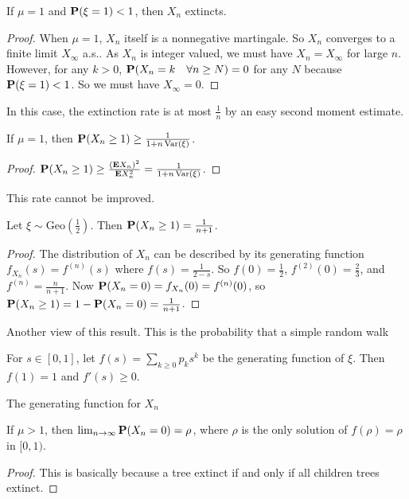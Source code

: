 \begin{theorem}[critical]
    If $\mu=1$ and $\mathbf{P}(\xi=1)<1$, then $X_n$ extincts.
\end{theorem}
\begin{proof}
    When $\mu=1$, $X_n$ itself is a nonnegative martingale. So $X_n$ converges to a finite limit $X_\infty$ a.s..
    As $X_n$ is integer valued, we must have $X_n= X_\infty$ for large $n$. 
    However, for any $k>0$, $\mathbf{P}(X_n=k\quad \forall n\geq N)=0$ for any $N$ because $\mathbf{P}(\xi=1)<1$. So we must have $X_\infty=0$.
\end{proof}
In this case, the extinction rate is at most $\frac{1}{n}$ by an easy second moment estimate.
\begin{theorem}
    If $\mu=1$, then $\mathbf{P}(X_n \geq 1)\geq\frac{1}{1+n\operatorname*{Var}(\xi)}$.
\end{theorem}
\begin{proof}
    $\mathbf{P}(X_n \geq 1)\geq\frac{(\mathbf{E} X_n)^2}{\mathbf{E} X_n^2}=\frac{1}{1+n\operatorname*{Var}(\xi)}$.
\end{proof}
This rate cannot be improved.
\begin{example}
    Let $\xi\sim\text{Geo}(\frac{1}{2})$. Then $\mathbf{P}(X_n \geq 1)=\frac{1}{n+1}$.
\end{example}
\begin{proof}
    The distribution of $X_n$ can be described by its generating function $f_{X_n}(s)=f^{(n)}(s)$
    where $f(s)=\frac{1}{2-s}$. So $f(0)=\frac{1}{2}$, $f^{(2)}(0)=\frac{2}{3}$, and $f^{(n)}=\frac{n}{n+1}$.
    Now $\mathbf{P}(X_n=0)=f_{X_n}(0)=f^{(n)}(0)$, so $\mathbf{P}(X_n \geq 1)=1-\mathbf{P}(X_n = 0)=\frac{1}{n+1}$.
\end{proof}
\begin{remark}
    Another view of this result.
    This is the probability that a simple random walk 
\end{remark}
For $s\in [0,1]$, let $f(s)=\sum_{k\geq 0}p_ks^k$ be the generating function of $\xi$.
Then $f(1)=1$ and $f'(s)\geq 0$.
\begin{lemma}
    The generating function for $X_n$
\end{lemma}


\begin{theorem}[supercritical]
    If $\mu>1$, then $\lim_{n\to\infty}\mathbf{P}(X_n=0)=\rho$, where $\rho$ is the only solution of $f(\rho)=\rho$ in $[0,1)$.
\end{theorem}
\begin{proof}
    This is basically because a tree extinct if and only if all children trees extinct.
\end{proof}



